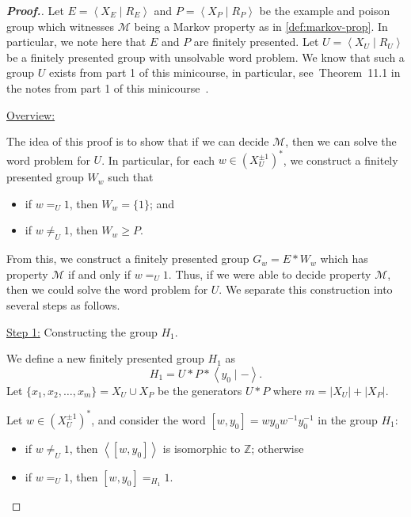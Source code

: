 \documentclass[11pt,a4paper,reqno]{amsart}
\theoremstyle{plain}
\theoremstyle{definition}
\theoremstyle{definition}
\renewcommand\geq\geqslant
\newenvironment{myproof}{\begin{proof}[\normalfont\bfseries Proof.]}{\end{proof}}
\begin{document}
\begin{myproof}
	Let $E = \left\langle X_E \mid R_E \right\rangle$ and $P = \left\langle X_P \mid R_P \right\rangle$ be the example and poison group which witnesses $\mathcal M$ being a Markov property as in \cref{def:markov-prop}.
	In particular, we note here that $E$ and $P$ are finitely presented.
	Let $U = \left\langle X_U \mid R_U\right\rangle$ be a finitely presented group with unsolvable word problem.
  We know that such a group $U$ exists from part 1 of this minicourse, in particular, see~Theorem~11.1 in the notes from part 1 of this minicourse~\cite{minicoursePart1}.

	\medskip

	\noindent
	\underline{Overview:}\nopagebreak

  \smallskip\nopagebreak
	\noindent
	The idea of this proof is to show that if we can decide $\mathcal M$, then we can solve the word problem for $U$.
	In particular, for each $w\in (X^{\pm 1}_U)^*$, we construct a finitely presented group $W_w$ such that
	\begin{itemize}
		\item if $w=_U 1$, then $W_w = \{1\}$; and
		\item if $w\neq_U 1$, then $W_w\geq P$.
	\end{itemize}
	From this, we construct a finitely presented group $G_w = E*W_w$ which has property $\mathcal M$ if and only if $w =_U 1$.
	Thus, if we were able to decide property $\mathcal M$, then we could solve the word problem for $U$.
	We separate this construction into several steps as follows.

	\medskip

	\noindent
	\underline{Step 1:} Constructing the group $H_1$.

	\smallskip
	\noindent
	We define a new finitely presented group $H_1$ as
	\[
		H_1
		=
		U * P * \left\langle y_0 \mid - \right\rangle.
	\]
	Let $\{x_1,x_2,\ldots,x_m\} = X_U \cup X_P$ be the generators $U * P$ where $m = |X_U| + |X_P|$.

  Let $w\in (X^{\pm 1}_U)^*$, and consider the word $[w,y_0] = w y_0 w^{-1} y_0^{-1}$ in the group $H_1$:
	\begin{itemize}
		\item if $w\neq_U 1$, then $\left\langle [w,y_0] \right\rangle$ is isomorphic to $\mathbb Z$; otherwise
		\item if $w=_U 1$, then $[w,y_0] =_{H_1} 1$.
	\end{itemize}


\end{myproof}
\end{document}
